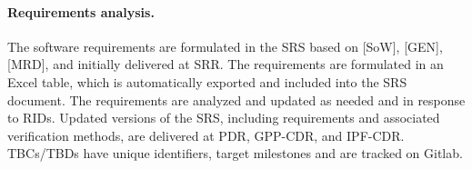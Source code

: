 %
%

%

\paragraph*{Requirements analysis.} The software requirements are formulated in the SRS based on [SoW], [GEN], [MRD], and initially delivered at SRR. The requirements are formulated in an Excel table, which is automatically exported and included into the SRS document. The requirements are analyzed and updated as needed and in response to RIDs. Updated versions of the SRS, including requirements and associated verification methods, are delivered at PDR, GPP-CDR, and IPF-CDR. TBCs/TBDs have unique identifiers, target milestones and are tracked on Gitlab.
    

